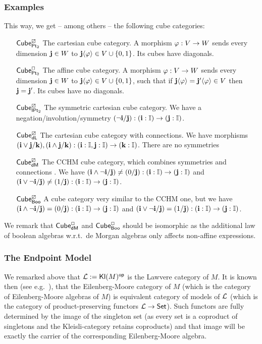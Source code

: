 \documentclass[a4paper]{memoir}
\begin{document}
\subsubsection{Examples}
This way, we get -- among others -- the following cube categories:
\begin{enumerate}
	\item[${\mathsf{Cube}}^\boxslash_{{\mathsf{Pt}_2}}$] The cartesian cube category.
	A morphism $\varphi : V \to W$ sends every dimension $\mathbf{j} \in W$ to $\mathbf{j} \langle \varphi \rangle \in V \cup \mathopen{}\left\{ 0, 1 \right\}\mathclose{}$.
	Its cubes have diagonals.
	\item[${\mathsf{Cube}}^\Box_{{\mathsf{Pt}_2}}$] The affine cube category.
	A morphism $\varphi : V \to W$ sends every dimension $\mathbf{j} \in W$ to $\mathbf{j} \langle \varphi \rangle \in V \cup \mathopen{}\left\{ 0, 1 \right\}\mathclose{}$, such that if $\mathbf{j}\langle \varphi \rangle = \mathbf{j}' \langle \varphi \rangle \in V$ then $\mathbf{j} = \mathbf{j}'$.
	Its cubes have no diagonals.
	\item[${\mathsf{Cube}}^\boxslash_{{\mathsf{IPt}_2}}$] The symmetric cartesian cube category. We have a negation/involution/symmetry $(\lnot \mathbf{i} / \mathbf{j}) : (\mathbf{i} : {\mathbb I}) \to (\mathbf{j} : {\mathbb I})$.
	\item[${\mathsf{Cube}}^\boxslash_{\mathsf{dL}}$] The cartesian cube category with connections. We have morphisms $(\mathbf{i} \vee \mathbf{j} / \mathbf{k}), (\mathbf{i} \wedge \mathbf{j} / \mathbf{k}) : (\mathbf{i} : {\mathbb I}, \mathbf{j} : {\mathbb I}) \to (\mathbf{k} : {\mathbb I})$. There are no symmetries
	\item[${\mathsf{Cube}}^\boxslash_{\mathsf{dM}}$] The CCHM cube category, which combines symmetries and connections \cite{cubical}. We have $(\mathbf{i} \wedge \lnot \mathbf{i} / \mathbf{j}) \neq (0/\mathbf{j}) : (\mathbf{i} : {\mathbb I}) \to (\mathbf{j} : {\mathbb I})$ and $(\mathbf{i} \vee \lnot \mathbf{i} / \mathbf{j}) \neq (1/\mathbf{j}) : (\mathbf{i} : {\mathbb I}) \to (\mathbf{j} : {\mathbb I})$.
	\item[${\mathsf{Cube}}^\boxslash_{\mathsf{Boo}}$] A cube category very similar to the CCHM one, but we have $(\mathbf{i} \wedge \lnot \mathbf{i} / \mathbf{j}) = (0/\mathbf{j}) : (\mathbf{i} : {\mathbb I}) \to (\mathbf{j} : {\mathbb I})$ and $(\mathbf{i} \vee \lnot \mathbf{i} / \mathbf{j}) = (1/\mathbf{j}) : (\mathbf{i} : {\mathbb I}) \to (\mathbf{j} : {\mathbb I})$.
\end{enumerate}
We remark that ${\mathsf{Cube}}^\Box_{\mathsf{dM}}$ and ${\mathsf{Cube}}^\Box_{\mathsf{Boo}}$ should be isomorphic as the additional law of boolean algebras w.r.t.\ de Morgan algebras only affects non-affine expressions.

\subsubsection{The Endpoint Model}
We remarked above that ${\mathcal L} := {\mathsf{Kl}}(M)^{\mathsf{op}}$ is the Lawvere category of $M$.
It is known then (see e.g.\ \cite{keml-diagrams}), that the Eilenberg-Moore category of $M$ (which is the category of Eilenberg-Moore algebras of $M$) is equivalent category of models of ${\mathcal L}$ (which is the category of product-preserving functors ${\mathcal L} \to {\mathsf{Set}}$).
Such functors are fully determined by the image of the singleton set (as every set is a coproduct of singletons and the Kleisli-category retains coproducts) and that image will be exactly the carrier of the corresponding Eilenberg-Moore algebra.
\end{document}

